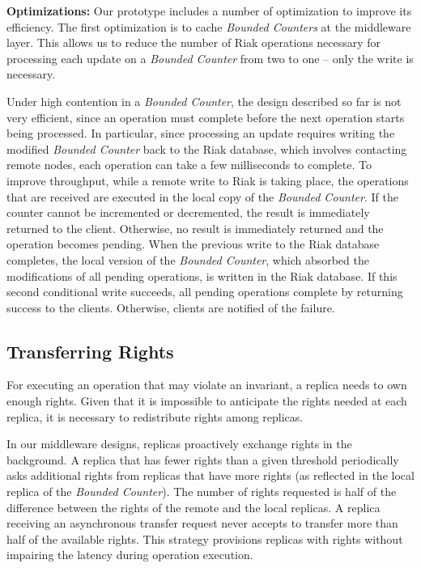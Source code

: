 \documentclass[conference]{IEEEtran}
\newcommand{\InvCounter}{\emph{Bounded Counter}}
\newcommand{\InvCounters}{\emph{Bounded Counters}}
\begin{document}
{\bf Optimizations:} 
Our prototype includes a number of optimization to improve its efficiency.
The first optimization is to cache \InvCounters{} at the middleware layer. 
This allows us to reduce the number of Riak operations necessary for processing 
each update on a \InvCounter{} from two to one -- only the write is necessary.

Under high contention in a \InvCounter{}, the design described so far is not very efficient, 
since an operation must complete before the next operation starts being processed. 
In particular, since processing an update requires writing the modified \InvCounter{}
back to the Riak database, which involves contacting remote nodes, each operation can 
take a few milliseconds to complete. 
To improve throughput, while a remote write to Riak is taking place, the operations 
that are received are executed in the local copy of the \InvCounter{}. 
If the counter cannot be incremented or decremented, the result is immediately returned to the client. 
Otherwise, no result is immediately returned and the operation becomes pending. 
When the previous write to the Riak database completes, the local version of 
the \InvCounter{}, which absorbed the modifications of all pending operations, 
is written in the Riak database.
If this second conditional write succeeds, all pending operations complete by 
returning success to the clients. 
Otherwise, clients are notified of the failure.


\subsection{Transferring Rights}

For executing an operation that may violate an invariant, a replica needs to own 
enough rights.
Given that it is impossible to anticipate the rights needed at each replica, it is
necessary to redistribute rights among replicas.

In our middleware designs, replicas proactively exchange 
rights in the background.
A replica that has fewer rights than a given threshold periodically asks
additional rights from replicas that have more rights
(as reflected in the local replica of the \InvCounter{}).
The number of rights requested is half of the difference between the rights 
of the remote and the local replicas.
A replica receiving an asynchronous transfer request never accepts to transfer 
more than half of the available rights.
This strategy provisions replicas with rights without impairing the latency 
during operation execution.
\end{document}
